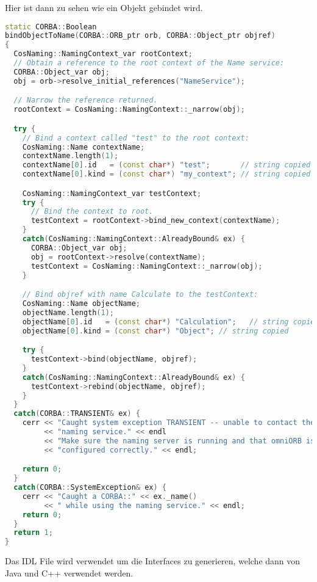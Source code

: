 \clearpage

Hier ist dann zu sehen wie ein Objekt gebindet wird.
\begin{lstlisting}[language=C++, caption=server.cc main Klasse welches die ORB und POA Objekte erstellt]
static CORBA::Boolean
bindObjectToName(CORBA::ORB_ptr orb, CORBA::Object_ptr objref)
{
  CosNaming::NamingContext_var rootContext;
  // Obtain a reference to the root context of the Name service:
  CORBA::Object_var obj;
  obj = orb->resolve_initial_references("NameService");

  // Narrow the reference returned.
  rootContext = CosNaming::NamingContext::_narrow(obj);

  try {
    // Bind a context called "test" to the root context:
    CosNaming::Name contextName;
    contextName.length(1);
    contextName[0].id   = (const char*) "test";       // string copied
    contextName[0].kind = (const char*) "my_context"; // string copied

    CosNaming::NamingContext_var testContext;
    try {
      // Bind the context to root.
      testContext = rootContext->bind_new_context(contextName);
    }
    catch(CosNaming::NamingContext::AlreadyBound& ex) {
      CORBA::Object_var obj;
      obj = rootContext->resolve(contextName);
      testContext = CosNaming::NamingContext::_narrow(obj);
    }

    // Bind objref with name Calculate to the testContext:
    CosNaming::Name objectName;
    objectName.length(1);
    objectName[0].id   = (const char*) "Calculation";   // string copied
    objectName[0].kind = (const char*) "Object"; // string copied

    try {
      testContext->bind(objectName, objref);
    }
    catch(CosNaming::NamingContext::AlreadyBound& ex) {
      testContext->rebind(objectName, objref);
    }
  }
  catch(CORBA::TRANSIENT& ex) {
    cerr << "Caught system exception TRANSIENT -- unable to contact the "
         << "naming service." << endl
         << "Make sure the naming server is running and that omniORB is "
         << "configured correctly." << endl;

    return 0;
  }
  catch(CORBA::SystemException& ex) {
    cerr << "Caught a CORBA::" << ex._name()
         << " while using the naming service." << endl;
    return 0;
  }
  return 1;
}

\end{lstlisting}

\clearpage

Das IDL File wird verwendet um die Interfaces zu generieren, welche dann von Java und C++ verwendet werden.

